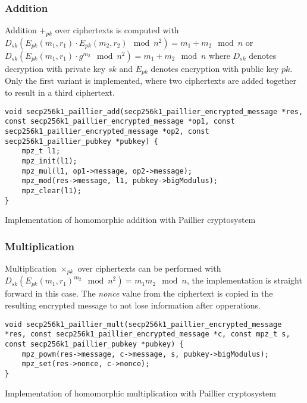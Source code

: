 \subsubsection{Addition}
Addition $+_{pk}$ over ciphertexts is computed with $D_{sk}(E_{pk}(m_1, r_1)
\cdot E_{pk}(m_2, r_2) \mod n^2) = m_1 + m_2 \mod n$ or $D_{sk}(E_{pk}(m_1, r_1)
\cdot g^{m_2} \mod n^2) = m_1 + m_2 \mod n$ where $D_{sk}$ denotes decryption
with private key $sk$ and $E_{pk}$ denotes encryption with public key $pk$. Only
the first variant is implemented, where two ciphertexts are added together to
result in a third ciphertext.

\begin{listing}
  \begin{verbatim}
void secp256k1_paillier_add(secp256k1_paillier_encrypted_message *res, const secp256k1_paillier_encrypted_message *op1, const secp256k1_paillier_encrypted_message *op2, const secp256k1_paillier_pubkey *pubkey) {
    mpz_t l1;
    mpz_init(l1);
    mpz_mul(l1, op1->message, op2->message);
    mpz_mod(res->message, l1, pubkey->bigModulus);
    mpz_clear(l1);
}
  \end{verbatim}
	\caption{Implementation of homomorphic addition with Paillier cryptosystem}
	\label{lst:implHomomorphAddPaillier}
\end{listing}

\subsubsection{Multiplication}

Multiplication $\times_{pk}$ over ciphertexts can be performed with
$D_{sk}(E_{pk}(m_1, r_1)^{m_2} \mod n^2) = m_1 m_2 \mod n$, the implementation
is straight forward in this case. The \textit{nonce} value from the ciphertext is copied
in the resulting encrypted message to not lose information after opperations.

\begin{listing}
  \begin{verbatim}
void secp256k1_paillier_mult(secp256k1_paillier_encrypted_message *res, const secp256k1_paillier_encrypted_message *c, const mpz_t s, const secp256k1_paillier_pubkey *pubkey) {
    mpz_powm(res->message, c->message, s, pubkey->bigModulus);
    mpz_set(res->nonce, c->nonce);
}
  \end{verbatim}
	\caption{Implementation of homomorphic multiplication with Paillier cryptosystem}
	\label{lst:implHomomorphMulPaillier}
\end{listing}

